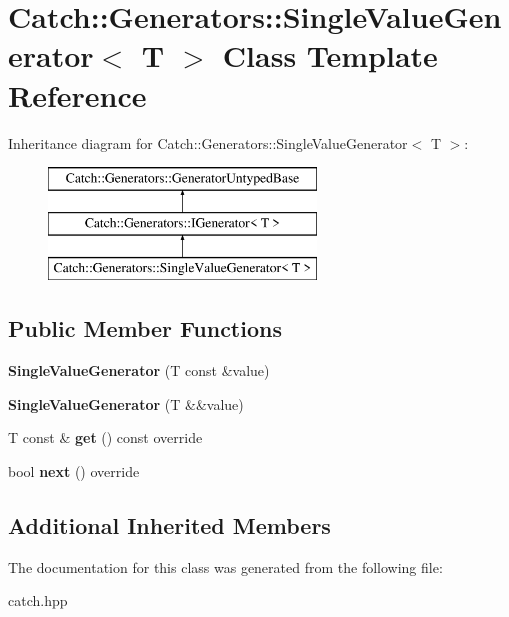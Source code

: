 \hypertarget{classCatch_1_1Generators_1_1SingleValueGenerator}{}\section{Catch\+::Generators\+::Single\+Value\+Generator$<$ T $>$ Class Template Reference}
\label{classCatch_1_1Generators_1_1SingleValueGenerator}
Inheritance diagram for Catch\+::Generators\+::Single\+Value\+Generator$<$ T $>$\+:\begin{figure}[H]
\begin{center}
\leavevmode
\includegraphics[height=3.000000cm]{classCatch_1_1Generators_1_1SingleValueGenerator}
\end{center}
\end{figure}
\subsection*{Public Member Functions}
\begin{DoxyCompactItemize}
\item 
\mbox{\label{classCatch_1_1Generators_1_1SingleValueGenerator_a4bed2ad14ffe04102d8135e2c82b3ace}} 
{\bfseries Single\+Value\+Generator} (T const \&value)
\item 
\mbox{\label{classCatch_1_1Generators_1_1SingleValueGenerator_a532140dd2d1a673692271bb76a661ebe}} 
{\bfseries Single\+Value\+Generator} (T \&\&value)
\item 
\mbox{\label{classCatch_1_1Generators_1_1SingleValueGenerator_a5142058c52131a2471e7307972f99b50}} 
T const  \& {\bfseries get} () const override
\item 
\mbox{\label{classCatch_1_1Generators_1_1SingleValueGenerator_a10833b34e3ccbc484624185712eb8b6e}} 
bool {\bfseries next} () override
\end{DoxyCompactItemize}
\subsection*{Additional Inherited Members}


The documentation for this class was generated from the following file\+:\begin{DoxyCompactItemize}
\item 
catch.\+hpp\end{DoxyCompactItemize}
